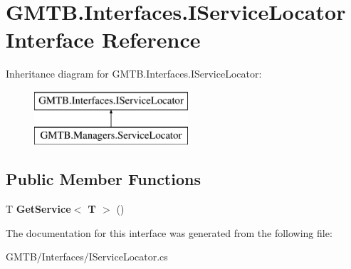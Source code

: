 \hypertarget{interface_g_m_t_b_1_1_interfaces_1_1_i_service_locator}{}\section{G\+M\+T\+B.\+Interfaces.\+I\+Service\+Locator Interface Reference}
\label{interface_g_m_t_b_1_1_interfaces_1_1_i_service_locator}
Inheritance diagram for G\+M\+T\+B.\+Interfaces.\+I\+Service\+Locator\+:\begin{figure}[H]
\begin{center}
\leavevmode
\includegraphics[height=2.000000cm]{interface_g_m_t_b_1_1_interfaces_1_1_i_service_locator}
\end{center}
\end{figure}
\subsection*{Public Member Functions}
\begin{DoxyCompactItemize}
\item 
\mbox{\label{interface_g_m_t_b_1_1_interfaces_1_1_i_service_locator_aa3112353d45c0cb543b0ffb18faafe48}} 
T {\bfseries Get\+Service$<$ T $>$} ()
\end{DoxyCompactItemize}


The documentation for this interface was generated from the following file\+:\begin{DoxyCompactItemize}
\item 
G\+M\+T\+B/\+Interfaces/I\+Service\+Locator.\+cs\end{DoxyCompactItemize}
